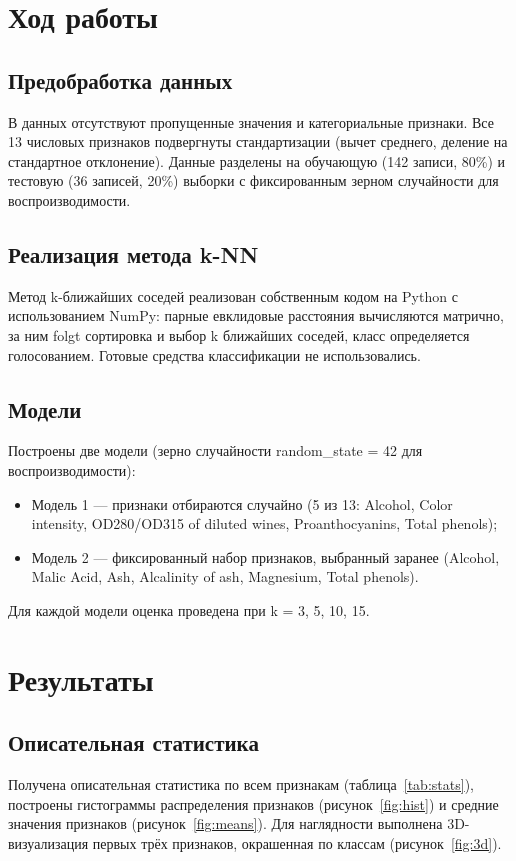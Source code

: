 \documentclass[12pt,a4paper]{article}
\begin{document}
\section{Ход работы}
\subsection{Предобработка данных}
В данных отсутствуют пропущенные значения и категориальные признаки. Все 13 числовых признаков подвергнуты стандартизации (вычет среднего, деление на стандартное отклонение). Данные разделены на обучающую (142 записи, 80\%) и тестовую (36 записей, 20\%) выборки с фиксированным зерном случайности для воспроизводимости.

\subsection{Реализация метода k-NN}
Метод k-ближайших соседей реализован собственным кодом на Python с использованием NumPy: парные евклидовые расстояния вычисляются матрично, за ним folgt сортировка и выбор k ближайших соседей, класс определяется голосованием. Готовые средства классификации не использовались.

\subsection{Модели}
Построены две модели (зерно случайности random\_state = 42 для воспроизводимости):
\begin{itemize}
\item Модель 1 --- признаки отбираются случайно (5 из 13: Alcohol, Color intensity, OD280/OD315 of diluted wines, Proanthocyanins, Total phenols);
\item Модель 2 --- фиксированный набор признаков, выбранный заранее (Alcohol, Malic Acid, Ash, Alcalinity of ash, Magnesium, Total phenols).
\end{itemize}
Для каждой модели оценка проведена при k = 3, 5, 10, 15.

\section{Результаты}
\subsection{Описательная статистика}
Получена описательная статистика по всем признакам (таблица~\ref{tab:stats}), построены гистограммы распределения признаков (рисунок~\ref{fig:hist}) и средние значения признаков (рисунок~\ref{fig:means}). Для наглядности выполнена 3D-визуализация первых трёх признаков, окрашенная по классам (рисунок~\ref{fig:3d}).
\end{document}
